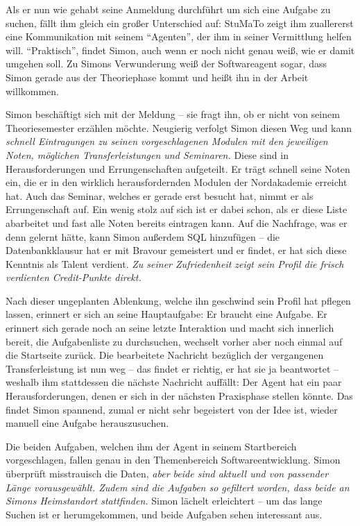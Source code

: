\documentclass[
  12pt,
  ngerman,
  a4paper,
]{article}
\begin{document}
Als er nun wie gehabt seine Anmeldung durchführt um sich eine Aufgabe zu
suchen, fällt ihm gleich ein großer Unterschied auf: StuMaTo zeigt ihm
zuallererst eine Kommunikation mit seinem ``Agenten'', der ihm in seiner
Vermittlung helfen will. ``Praktisch'', findet Simon, auch wenn er noch
nicht genau weiß, wie er damit umgehen soll. Zu Simons Verwunderung weiß
der Softwareagent sogar, dass Simon gerade aus der Theoriephase kommt
und heißt ihn in der Arbeit willkommen.

Simon beschäftigt sich mit der Meldung -- sie fragt ihn, ob er nicht von
seinem Theoriesemester erzählen möchte. Neugierig verfolgt Simon diesen
Weg und kann \emph{schnell Eintragungen zu seinen vorgeschlagenen
Modulen mit den jeweiligen Noten, möglichen Transferleistungen und
Seminaren.} Diese sind in Herausforderungen und Errungenschaften
aufgeteilt. Er trägt schnell seine Noten ein, die er in den wirklich
herausfordernden Modulen der Nordakademie erreicht hat. Auch das
Seminar, welches er gerade erst besucht hat, nimmt er als Errungenschaft
auf. Ein wenig stolz auf sich ist er dabei schon, als er diese Liste
abarbeitet und fast alle Noten bereits eintragen kann. Auf die
Nachfrage, was er denn gelernt hätte, kann Simon außerdem SQL hinzufügen
-- die Datenbankklausur hat er mit Bravour gemeistert und er findet, er
hat sich diese Kenntnis als Talent verdient. \emph{Zu seiner
Zufriedenheit zeigt sein Profil die frisch verdienten Credit-Punkte
direkt.}

Nach dieser ungeplanten Ablenkung, welche ihn geschwind sein Profil hat
pflegen lassen, erinnert er sich an seine Hauptaufgabe: Er braucht eine
Aufgabe. Er erinnert sich gerade noch an seine letzte Interaktion und
macht sich innerlich bereit, die Aufgabenliste zu durchsuchen, wechselt
vorher aber noch einmal auf die Startseite zurück. Die bearbeitete
Nachricht bezüglich der vergangenen Transferleistung ist nun weg -- das
findet er richtig, er hat sie ja beantwortet -- weshalb ihm stattdessen
die nächste Nachricht auffällt: Der Agent hat ein paar
Herausforderungen, denen er sich in der nächsten Praxisphase stellen
könnte. Das findet Simon spannend, zumal er nicht sehr begeistert von
der Idee ist, wieder manuell eine Aufgabe herauszusuchen.

Die beiden Aufgaben, welchen ihm der Agent in seinem Startbereich
vorgeschlagen, fallen genau in den Themenbereich Softwareentwicklung.
Simon überprüft misstrauisch die Daten, \emph{aber beide sind aktuell
und von passender Länge vorausgewählt. Zudem sind die Aufgaben so
gefiltert worden, dass beide an Simons Heimstandort stattfinden.} Simon
lächelt erleichtert -- um das lange Suchen ist er herumgekommen, und
beide Aufgaben sehen interessant aus.
\end{document}
